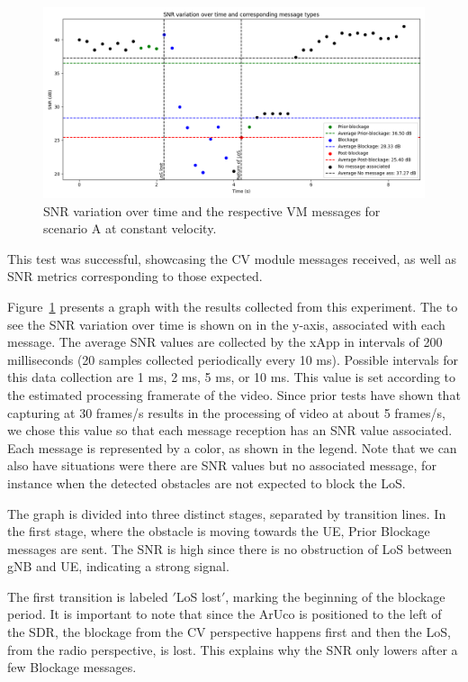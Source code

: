 \begin{figure}[H]
    \centering
    \includegraphics[width=\linewidth]{figures/results_0}
    \caption{SNR variation over time and the respective VM messages for scenario A at constant velocity.}
    \label{fig:results_0}
\end{figure}


This test was successful, showcasing the CV module messages received, as well as SNR metrics corresponding to those expected.

Figure~\ref{fig:results_0} presents a graph with the results collected from this experiment.
The to see the SNR variation over time is shown on in the y-axis, associated with each message.
The average SNR values are collected by the xApp in intervals of 200 milliseconds (20 samples collected periodically every 10 ms).
Possible intervals for this data collection are 1 ms, 2 ms, 5 ms, or 10 ms.
This value is set according to the estimated processing framerate of the video.
Since prior tests have shown that capturing at 30 frames/s results in the processing of video at about 5 frames/s, we chose this value so that each message reception has an SNR value associated.
Each message is represented by a color, as shown in the legend.
Note that we can also have situations were there are SNR values but no associated message, for instance when the detected obstacles are not expected to block the LoS\@.

The graph is divided into three distinct stages, separated by transition lines.
In the first stage, where the obstacle is moving towards the UE, Prior Blockage messages are sent.
The SNR is high  since there is no obstruction of LoS between gNB and UE, indicating a strong signal.

The first transition is labeled \('\)LoS lost\('\), marking the beginning of the blockage period.
It is important to note that since the ArUco is positioned to the left of the SDR, the blockage from the CV perspective happens first and then the LoS, from the radio perspective, is lost.
This explains why the SNR only lowers after a few Blockage messages.

